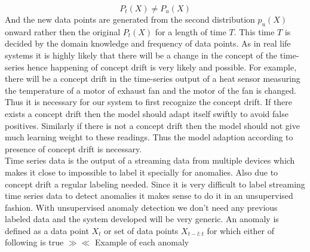 \documentclass[12pt]{article}
\begin{document}
\begin{equation}
    P_t(X) \neq P_u(X)
\end{equation}
And the new data points are generated from the second distribution $p_u(X)$ onward rather then the original $P_t(X)$ for a length of time $T$. This time $T$ is decided by the domain knowledge and frequency of data points.
As in real life systems it is highly likely that there will be a change in the concept of the time-series hence happening of concept drift is very likely and possible. For example, there will be a concept drift in the time-series output of a heat sensor measuring the temperature of a motor of exhaust fan and the motor of the fan is changed. Thus it is necessary for our system to first recognize the concept drift. If there exists a concept drift then the model should adapt itself swiftly to avoid false positives. Similarly if there is not a concept drift then the model should not give much learning weight to these readings. Thus the model adaption according to presence of concept drift is necessary.\\
\break
Time series data is the output of a streaming data from multiple devices which makes it close to impossible to label it specially for anomalies. Also due to concept drift a regular labeling needed. Since it is very difficult to label streaming time series data to detect anomalies it makes sense to do it in an unsupervised fashion. With unsupervised anomaly detection we don't need any previous labeled data and the system developed will be very generic.
An anomaly is defined as a data point $X_t$ or set of data points $X_{t-l:t}$ for which either of following is true
$\gg \ll$ Example of each anomaly
\end{document}
